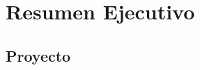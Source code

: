 \documentclass[11pt,letterpaper]{report}
\begin{document}
\renewcommand{\tablename}{Tabla}
\renewcommand{\figurename}{Figura}
\renewcommand{\contentsname}{Índice}
\renewcommand{\listtablename}{Índice de tablas}
\renewcommand{\appendixname}{Anexo}
\renewcommand{\appendixtocname}{Anexos}
\renewcommand{\appendixpagename}{Anexos}



	\oddsidemargin 0cm \topmargin -2cm \textheight 21cm \textwidth
	16.5cm \headheight 1cm \linespread {1.0} \headsep 1cm \parindent 0mm

	

	\topmargin 0cm
	\pagestyle{empty}
	\pagestyle{fancy}


\setlength{\parskip}{8pt}
\setlength{\parindent}{12pt}

\chapter*{Resumen Ejecutivo}

\newpage

\section*{Proyecto}
\end{document}
